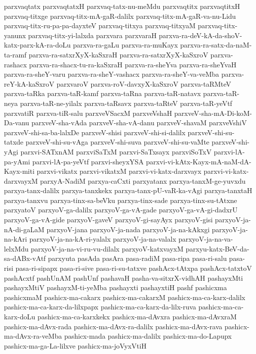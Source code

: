 {parxvaqtatx
parxvaqtatxH
parxvaq-tatx-nu-meMdu
parxvaqtitx
parxvaqtitxH
parxvaq-titxge
parxvaq-titx-mA-gaR-dalilx
parxvaq-titx-mA-gaR-va-nu-Lidu
parxvaq-titx-ru-pa-pa-dayxteV
parxvaq-titxya
parxvaq-titxyaM
parxvaq-titx-yanunx
parxvaq-titx-yi-lalxda
parxvara
parxvaraH
parxva-ra-deV-kA-da-shoV-katx-parx-kA-ra-doLu
parxva-ra-gaLu
parxva-ra-muKayx
parxva-ra-satx-da-naM-ta-ramf
parxva-ra-satxrXyX-kaSxraH
parxva-ra-satxrXyX-kaSxroV
parxva-rashacx
parxva-ra-shacx-tu-ra-kaSxraH
parxva-ra-sheYva
parxva-ra-sheYvaH
parxva-ra-sheY-varu
parxva-ra-sheY-vashacx
parxva-ra-sheY-va-veMba
parxva-reY-kA-kaSxroV
parxvaroV
parxva-roV-davxyX-kaSxroV
parxva-taRMteV
parxva-taRka
parxva-taR-kamf
parxva-taRna
parxva-taR-natavx
parxva-taR-neya
parxva-taR-ne-yilalx
parxva-taRsavx
parxva-taRteV
parxva-taR-yeVtf
parxvatiR
parxva-tiR-salu
parxveVSacxM
parxveVshaH
parxveV-sha-mA-Di-koM-Da-vanu
parxveV-sha-vAda
parxveV-sha-vA-danu
parxveV-shavaM
parxveVshiV
parxveV-shi-sa-ba-lalxDe
parxveV-shisi
parxveV-shi-si-dalilx
parxveV-shi-su-tatxde
parxveV-shi-su-vAga
parxveV-shi-suva
parxveV-shi-su-vaMte
parxveV-shi-yAgi
parxvi-SATxnAM
parxviSaTxM
parxvi-SaTxsayx
parxviSoTxV
parxvi-lA-pa-yAmi
parxvi-lA-pa-yeVtf
parxvi-sheyxYSA
parxvi-vi-kAtx-Kayx-mA-naM-dA-Kayx-miti
parxvi-vikatx
parxvi-vikatxM
parxvi-vi-katx-darxvayx
parxvi-vi-katx-darxvayxM
parxyA-NadiM
parxya-caCxti
parxyatanx
parxya-tanxM-ge-yuvxdu
parxya-tanx-dalilx
parxya-tanxkekx
parxya-tanx-pU-vaR-ka-vAgi
parxya-tanxtaH
parxya-tanxvu
parxya-tinx-sa-beVku
parxya-tinx-sade
parxya-tinx-su-tAtxne
parxyatoV
parxyoV-ga-dalilx
parxyoV-ga-vA-gade
parxyoV-ga-vA-gi-dadxrU
parxyoV-ga-vA-gide
parxyoV-gaveV
parxyoV-gi-sayAyx
parxyoV-gisi
parxyoV-ja-nA-di-gaLaM
parxyoV-jana
parxyoV-ja-nada
parxyoV-ja-na-kAkxgi
parxyoV-ja-na-kAri
parxyoV-ja-na-kA-ri-yalalx
parxyoV-ja-na-valalx
parxyoV-ja-na-va-lelxMdu
parxyoV-ja-na-vi-ru-vu-dilalx
parxyoV-katxvayxM
parxyu-katx-BeV-da-sa-dABx-vAtf
parxyuta
pasAda
pasAra
pasa-radiM
pasa-ripa
pasa-ri-salu
pasa-risi
pasa-ri-sipapx
pasa-ri-sive
pasa-ri-su-tatxve
pashAcx-tAtxpa
pashAcx-tatxtoV
pashAcxtf
pashUnAM
pashUnf
pashavaH
pasha-va-sitxrX-vidhAH
pashayxMti
pashayxMtiV
pashayxM-ti-yeMba
pashayxti
pashayxtiH
pashf
pashicxma
pashicxmaM
pashicx-ma-cakarx
pashicx-ma-cakarxM
pashicx-ma-ca-karx-dalilx
pashicx-ma-ca-karx-da-lilxpapx
pashicx-ma-ca-karx-da-lilx-ruva
pashicx-ma-ca-karx-doLu
pashicx-ma-ca-karxkekx
pashicx-ma-dAvxra
pashicx-ma-dAvxraM
pashicx-ma-dAvx-rada
pashicx-ma-dAvx-ra-dalilx
pashicx-ma-dAvx-rava
pashicx-ma-dAvx-ra-veMba
pashicx-mada
pashicx-ma-dalilx
pashicx-ma-do-Lapupx
pashicx-ma-ga-La-lilxve
pashicx-ma-joVyxVtiH
}

